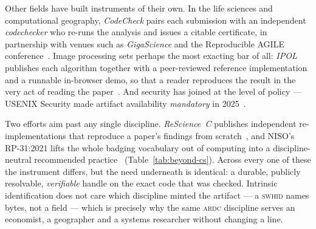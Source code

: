 Other fields have built instruments of their own. In the life sciences and computational
geography, \emph{CodeCheck} pairs each submission with an independent \emph{codechecker} who
re-runs the analysis and issues a citable certificate, in partnership with venues such as
\emph{GigaScience} and the Reproducible AGILE conference~\autocite{codecheck}. Image processing
sets perhaps the most exacting bar of all: \emph{IPOL} publishes each algorithm together with a
peer-reviewed reference implementation and a runnable in-browser demo, so that a reader
reproduces the result in the very act of reading the paper~\autocite{ipol}. And security has
joined at the level of policy --- USENIX Security made artifact availability \emph{mandatory} in
2025~\autocite{usenixsec2025artifacts}.

Two efforts aim past any single discipline. \emph{ReScience~C} publishes independent
re-implementations that reproduce a paper's findings from scratch~\autocite{resciencec}, and
NISO's RP-31:2021 lifts the whole badging vocabulary out of computing into a discipline-neutral
recommended practice~\autocite{nisorp31} (Table~\ref{tab:beyond-cs}). Across every one of these
the instrument differs, but the need underneath is identical: a durable, publicly resolvable,
\emph{verifiable} handle on the exact code that was checked. Intrinsic identification does not
care which discipline minted the artifact --- a \textsc{swhid} names bytes, not a field --- which
is precisely why the same \textsc{ardc} discipline serves an economist, a geographer and a systems
researcher without changing a line.



